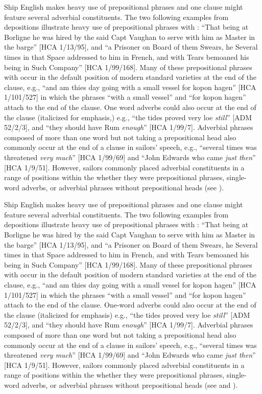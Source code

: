 {\color{red}
Ship English makes heavy use of prepositional phrases and one clause might feature several adverbial constituents. The two following examples from depositions illustrate heavy use of prepositional phrases with : “That being at Borligne he was hired by the said Capt Vaughan to serve with him as Master in the barge” [HCA 1/13/95], and “a Prisoner on Board of them Swears, he Several times in that Space addressed to him in French, and with Tears bemoaned his being in Such Company” [HCA 1/99/168]. Many of these prepositional phrases with  occur in the default position of modern standard varieties at the end of the clause, e.g., “and am thies day going with a small vessel for kopon hagen” [HCA 1/101/527] in which the phrases “with a small vessel” and “for kopon hagen” attach to the end of the clause. One word adverbs could also occur at the end of the clause (italicized for emphasis,) e.g., “the tides proved very loe \textit{still}” [ADM 52/2/3], and “they should have Rum \textit{enough}” [HCA 1/99/7]. Adverbial phrases composed of more than one word but not taking a prepositional head also commonly occur at the end of a clause in sailors’ speech, e.g., “several times was threatened \textit{very much}” [HCA 1/99/69] and “John Edwards who came \textit{just then}” [HCA 1/9/51]. However, sailors commonly placed adverbial constituents in a range of positions within the  whether they were prepositional phrases, single-word adverbs, or adverbial phrases without prepositional heads (see
). 

Ship English makes heavy use of prepositional phrases and one clause might feature several adverbial constituents. The two following examples from depositions illustrate heavy use of prepositional phrases with : “That being at Borligne he was hired by the said Capt Vaughan to serve with him as Master in the barge” [HCA 1/13/95], and “a Prisoner on Board of them Swears, he Several times in that Space addressed to him in French, and with Tears bemoaned his being in Such Company” [HCA 1/99/168]. Many of these prepositional phrases with  occur in the default position of modern standard varieties at the end of the clause, e.g., “and am thies day going with a small vessel for kopon hagen” [HCA 1/101/527] in which the phrases “with a small vessel” and “for kopon hagen” attach to the end of the clause. One-word adverbs could also occur at the end of the clause (italicized for emphasis) e.g., “the tides proved very loe \textit{still}” [ADM 52/2/3], and “they should have Rum \textit{enough}” [HCA 1/99/7]. Adverbial phrases composed of more than one word but not taking a prepositional head also commonly occur at the end of a clause in sailors’ speech, e.g., “several times was threatened \textit{very much}” [HCA 1/99/69] and “John Edwards who came \textit{just then}” [HCA 1/9/51]. However, sailors commonly placed adverbial constituents in a range of positions within the  whether they were prepositional phrases, single-word adverbs, or adverbial phrases without prepositional heads (see  and ). 
}

